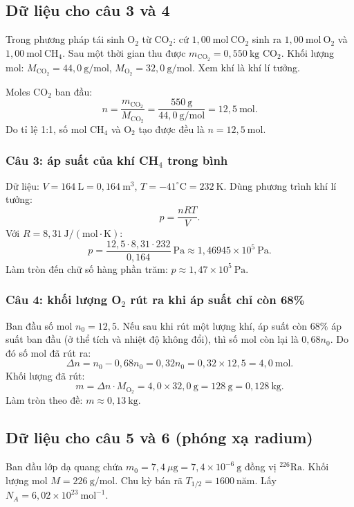 \documentclass[12pt,a4paper]{article}
\begin{document}
\bigskip
\subsection*{Dữ liệu cho câu 3 và 4}
Trong phương pháp tái sinh O$_2$ từ CO$_2$: cứ $1{,}00\ \mathrm{mol\ CO_2}$ sinh ra $1{,}00\ \mathrm{mol\ O_2}$ và $1{,}00\ \mathrm{mol\ CH_4}$. Sau một thời gian thu được $m_{\mathrm{CO_2}}=0{,}550\ \mathrm{kg}$ CO$_2$. Khối lượng mol: $M_{\mathrm{CO_2}}=44{,}0\ \mathrm{g/mol}$, $M_{\mathrm{O_2}}=32{,}0\ \mathrm{g/mol}$. Xem khí là khí lí tưởng.

Moles CO$_2$ ban đầu:
\[
n=\frac{m_{\mathrm{CO_2}}}{M_{\mathrm{CO_2}}}
=\frac{550\ \mathrm{g}}{44{,}0\ \mathrm{g/mol}}=12{,}5\ \mathrm{mol}.
\]
Do tỉ lệ 1:1, số mol $\mathrm{CH_4}$ và $\mathrm{O_2}$ tạo được đều là $n=12{,}5\ \mathrm{mol}$.

\subsubsection*{Câu 3: áp suất của khí CH$_4$ trong bình}
Dữ liệu: $V=164\ \mathrm{L}=0{,}164\ \mathrm{m^3}$, $T=-41^\circ\mathrm{C}=232\ \mathrm{K}$. Dùng phương trình khí lí tưởng:
\[
p=\frac{nRT}{V}.
\]
Với $R=8{,}31\ \mathrm{J/(mol\cdot K)}$:
\[
p=\frac{12{,}5\cdot 8{,}31\cdot 232}{0{,}164}\ \mathrm{Pa}
\approx 1{,}46945\times10^{5}\ \mathrm{Pa}.
\]
Làm tròn đến chữ số hàng phần trăm: $p\approx 1{,}47\times10^{5}\ \mathrm{Pa}$.

\subsubsection*{Câu 4: khối lượng O$_2$ rút ra khi áp suất chỉ còn 68\%}
Ban đầu số mol $n_0=12{,}5$. Nếu sau khi rút một lượng khí, áp suất còn $68\%$ áp suất ban đầu (ở thể tích và nhiệt độ không đổi), thì số mol còn lại là $0{,}68n_0$. Do đó số mol đã rút ra:
\[
\Delta n = n_0 - 0{,}68 n_0 = 0{,}32 n_0 = 0{,}32\times 12{,}5=4{,}0\ \text{mol}.
\]
Khối lượng đã rút:
\[
m=\Delta n\cdot M_{\mathrm{O_2}} =4{,}0\times 32{,}0\ \mathrm{g}=128\ \mathrm{g}=0{,}128\ \mathrm{kg}.
\]
Làm tròn theo đề: $m\approx 0{,}13\ \mathrm{kg}$.

\bigskip
\subsection*{Dữ liệu cho câu 5 và 6 (phóng xạ radium)}
Ban đầu lớp dạ quang chứa $m_0=7{,}4\ \mu\mathrm{g}=7{,}4\times10^{-6}\ \mathrm{g}$ đồng vị $^{226}\mathrm{Ra}$. Khối lượng mol $M=226\ \mathrm{g/mol}$. Chu kỳ bán rã $T_{1/2}=1600\ \text{năm}$. Lấy $N_A=6{,}02\times10^{23}\ \mathrm{mol^{-1}}$.
\end{document}
